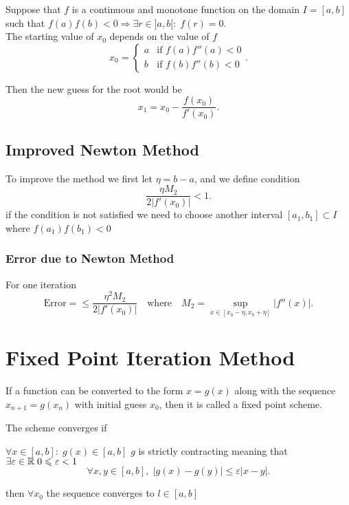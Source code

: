 \documentclass{report}
\begin{document}
Suppose that $f$ is a continuous and monotone function on the domain $I = [a,b]$ such that $f(a)f(b)<0\Rightarrow \exists r \in]a,b[:\;f(r)=0$.\\

The starting value of $x_0$ depends on the value of $f$
\[
	x_0 = \begin{cases}
		a & \text{if }f(a)f''(a)<0 \\
		b & \text{if }f(b)f''(b)<0
	\end{cases}
	.\]

Then the new guess for the root would be
\[
	x_1 = x_0 - \frac{f(x_0)}{f'(x_0)}
	.\]

\subsection{Improved Newton Method}
To improve the method we first let $\eta = b-a$, and we define condition
\[
	\frac{\eta M_2}{2|f'(x_0)|}<1
	.\]
if the condition is not satisfied we need to choose another interval $[a_1,b_1]\subset I$ where $f(a_1)f(b_1)<0$

\subsubsection{Error due to Newton Method}

For one iteration
\[
	\text{Error} = \leq \frac{\eta^2 M_2}{2|f'(x_0)|} \quad\text{where}\quad M_2 = \sup_{x\in[x_0-\eta,x_0+\eta]} |f''(x)|
	.\]

\section{Fixed Point Iteration Method}
If a function can be converted to the form $x=g(x)$ along with the sequence $x_{n+1} = g(x_n)$ with initial guess $x_0$, then it is called a fixed point scheme.

The scheme converges if
\begin{itemize}
	\ii $\forall x \in [a,b]:\; g(x)\in[a,b]$
	\ii $g$ is strictly contracting meaning that $\exists \varepsilon \in \RR\; 0\leq \varepsilon < 1$
	\[
		\forall x,y \in[a,b],\; |g(x)-g(y)|\leq \varepsilon|x-y|
		.\]
\end{itemize}
then $\forall x_0$ the sequence converges to $l\in[a,b]$

\nt{
	\[
		\sup_{x\in[a,b]}|g'(x)| = L<1\Rightarrow g(x)\text{ is strictly contracting}
		.\]
}

\end{document}
